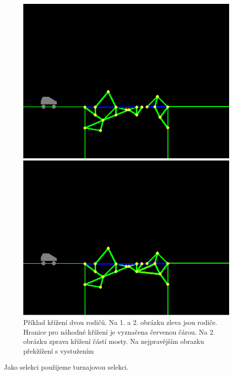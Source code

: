 \begin{figure}[ht]
\begin{minipage}{0.24\textwidth}
        \includegraphics[width=\linewidth]{img/bridge_crossed.png}
    \end{minipage}
    \begin{minipage}{0.24\textwidth}
        \centering
        \includegraphics[width=\linewidth]{img/bridge_sups.png}
    \end{minipage}
    \caption{Příklad křížení dvou rodičů. Na 1. a 2. obrázku zleva jsou rodiče. Hranice pro náhodné křížení je vyznačena červenou čárou. Na 2. obrázku zprava křížení částí mosty. Na nejpravějším obrazku překžížení s vystužením}
    \label{impl-fig:8}
\end{figure}



Jako selekci použijeme turnajovou selekci.

